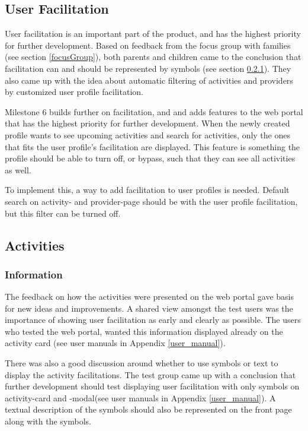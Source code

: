 \subsection{User Facilitation}
\label{UserFacilitation}
User facilitation is an important part of the product, and has the highest priority for further development. Based on feedback from the focus group with families (see section \ref{focusGroup}), both parents and children came to the conclusion that facilitation can and should be represented by symbols (see section \ref{UserFeedbackAboutActivities}). They also came up with the idea about automatic filtering of activities and providers by customized user profile facilitation.

Milestone 6 builds further on facilitation, and and adds features to the web portal that has the highest priority for further development. When the newly created profile wants to see upcoming activities and search for activities, only the ones that fits the user profile's facilitation are displayed. This feature is something the profile should be able to turn off, or bypass, such that they can see all activities as well.

To implement this, a way to add facilitation to user profiles is needed. Default search on activity- and provider-page should be with the user profile facilitation, but this filter can be turned off.

\subsection{Activities}
\subsubsection{Information}
\label{UserFeedbackAboutActivities}
The feedback on how the activities were presented on the web portal gave basis for new ideas and improvements. A shared view amongst the test users was the importance of showing user facilitation as early and clearly as possible. The users who tested the web portal, wanted this information displayed already on the activity card (see user manuals in Appendix \ref{user_manual}).

There was also a good discussion around whether to use symbols or text to display the activity facilitations. The test group came up with a conclusion that further development should test displaying user facilitation with only symbols on activity-card and -modal(see user manuals in Appendix \ref{user_manual}). A textual description of the symbols should also be represented on the front page along with the symbols.

